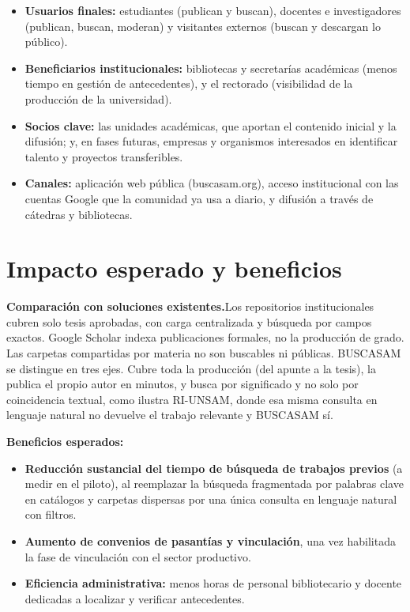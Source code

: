 \documentclass[12pt,a4paper]{article}
\begin{document}
\begin{itemize}
  \item \textbf{Usuarios finales:} estudiantes (publican y buscan), docentes e investigadores (publican, buscan, moderan) y visitantes externos (buscan y descargan lo público).
  \item \textbf{Beneficiarios institucionales:} bibliotecas y secretarías académicas (menos tiempo en gestión de antecedentes), y el rectorado (visibilidad de la producción de la universidad).
  \item \textbf{Socios clave:} las unidades académicas, que aportan el contenido inicial y la difusión; y, en fases futuras, empresas y organismos interesados en identificar talento y proyectos transferibles.
  \item \textbf{Canales:} aplicación web pública (buscasam.org), acceso institucional con las cuentas Google que la comunidad ya usa a diario, y difusión a través de cátedras y bibliotecas.
\end{itemize}

\section{Impacto esperado y beneficios}

\noindent\textbf{Comparación con soluciones existentes.}\enspace Los repositorios institucionales cubren solo tesis aprobadas, con carga centralizada y búsqueda por campos exactos. Google Scholar indexa publicaciones formales, no la producción de grado. Las carpetas compartidas por materia no son buscables ni públicas. BUSCASAM se distingue en tres ejes. Cubre toda la producción (del apunte a la tesis), la publica el propio autor en minutos, y busca por significado y no solo por coincidencia textual, como ilustra RI-UNSAM, donde esa misma consulta en lenguaje natural no devuelve el trabajo relevante y BUSCASAM sí.

\medskip
\noindent\textbf{Beneficios esperados:}
\begin{itemize}
  \item \textbf{Reducción sustancial del tiempo de búsqueda de trabajos previos} (a medir en el piloto), al reemplazar la búsqueda fragmentada por palabras clave en catálogos y carpetas dispersas por una única consulta en lenguaje natural con filtros.
  \item \textbf{Aumento de convenios de pasantías y vinculación}, una vez habilitada la fase de vinculación con el sector productivo.
  \item \textbf{Eficiencia administrativa:} menos horas de personal bibliotecario y docente dedicadas a localizar y verificar antecedentes.
\end{itemize}
\end{document}
